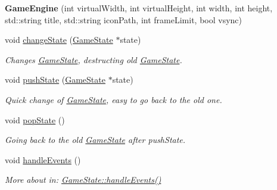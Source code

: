 \begin{DoxyCompactItemize}
\item 
\mbox{\label{class_game_engine_a5365f65c15fa45ab2f6e4e661f6fbd5f}} 
{\bfseries Game\+Engine} (int virtual\+Width, int virtual\+Height, int width, int height, std\+::string title, std\+::string icon\+Path, int frame\+Limit, bool vsync)
\item 
\mbox{\label{class_game_engine_a2a83394496e5c9060b9f8ddb5a7abd24}} 
void \mbox{\hyperlink{class_game_engine_a2a83394496e5c9060b9f8ddb5a7abd24}{change\+State}} (\mbox{\hyperlink{class_game_state}{Game\+State}} $\ast$state)
\begin{DoxyCompactList}\small\item\em Changes \mbox{\hyperlink{class_game_state}{Game\+State}}, destructing old \mbox{\hyperlink{class_game_state}{Game\+State}}. \end{DoxyCompactList}\item 
\mbox{\label{class_game_engine_a082e38033f8dc63b2d130a0cfd3fbdd9}} 
void \mbox{\hyperlink{class_game_engine_a082e38033f8dc63b2d130a0cfd3fbdd9}{push\+State}} (\mbox{\hyperlink{class_game_state}{Game\+State}} $\ast$state)
\begin{DoxyCompactList}\small\item\em Quick change of \mbox{\hyperlink{class_game_state}{Game\+State}}, easy to go back to the old one. \end{DoxyCompactList}\item 
\mbox{\label{class_game_engine_a21d2ebf3778429727595a8b87893314f}} 
void \mbox{\hyperlink{class_game_engine_a21d2ebf3778429727595a8b87893314f}{pop\+State}} ()
\begin{DoxyCompactList}\small\item\em Going back to the old \mbox{\hyperlink{class_game_state}{Game\+State}} after push\+State. \end{DoxyCompactList}\item 
\mbox{\label{class_game_engine_a15e2e71a499386e3a19bbba361be4377}} 
void \mbox{\hyperlink{class_game_engine_a15e2e71a499386e3a19bbba361be4377}{handle\+Events}} ()
\begin{DoxyCompactList}\small\item\em More about in\+: \mbox{\hyperlink{class_game_state_a3ef0638514dbfe71581d593cf0f66ce5}{Game\+State\+::handle\+Events()}} \end{DoxyCompactList}\item 

\end{DoxyCompactItemize}
